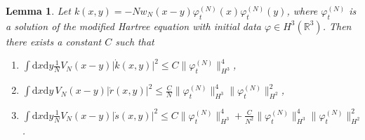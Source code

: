 \documentclass[11pt,a4paper,DIV11]{scrartcl}	%
\newtheorem{lem}[thm]{Lemma}
\newcommand{\di}{\textrm{d}}		%
\newcommand{\Rbb}{\mathbb{R}}		%
\newcommand{\norm}[1]{\lVert#1\rVert}	%
\newcommand{\ph}{\varphi_t^{(N)}}	%
\begin{document}
\begin{lem}
\label{lem:dottedests2}
Let $k(x,y) = -N w_N(x-y) \ph(x) \ph(y)$, where $\ph$ is a solution of the modified Hartree equation with initial data $\varphi \in H^3(\Rbb^3)$. Then there exists a constant $C$ such that
\begin{enumerate}
 \item $\int \di x \di y \frac{1}{N} V_N(x-y) \lvert \dot k(x,y)\rvert^2 \leq C \norm{\ph}_{H^3}^4$, 
 \item $\int \di x\di y\, V_N(x-y) \lvert \dot r(x,y)\rvert^2 \leq \frac{C}{N} \norm{\ph}_{H^3}^4 \norm{\ph}_{H^2}^2$,
 \item $\int \di x\di y\frac{1}{N} V_N(x-y) \lvert \dot s(x,y)\rvert^2 \leq C \norm{\ph}_{H^3}^4 + \frac{C}{N^2} \norm{\ph}_{H^3}^4 \norm{\ph}_{H^2}^2$.
\end{enumerate}
\end{lem}
\end{document}
